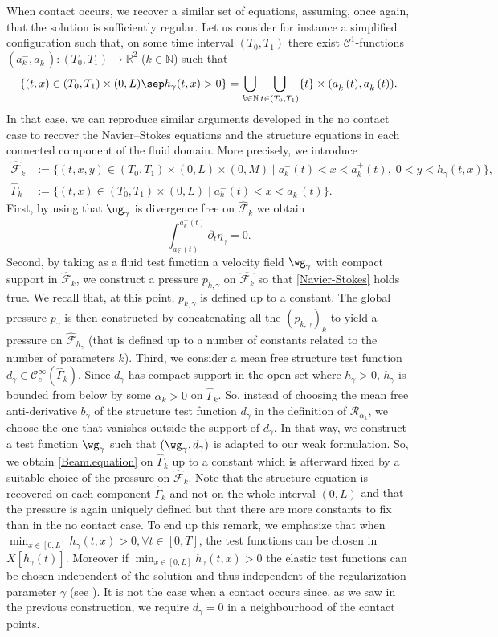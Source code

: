 When contact occurs, we recover a similar set of equations, assuming, once again, that the solution is sufficiently regular. Let us consider for instance a simplified configuration such that, on some time interval $(T_0,T_1)$ there exist $\mathcal C^1$-functions $(a_k^{-},a_k^+): (T_0,T_1) \to \mathbb R^2$ ($k\in \mathbb N$) such that
\[
\{(t,x) \in (T_0,T_1 )\times(0,L) \sep h_\gamma(t,x) >0 \} = \bigcup_{k\in\mathbb N} \bigcup_{t\in (T_0,T_1)} \{t\} \times (a_k^{-}(t),a_{k}^+(t)).
\]
In that case, we can reproduce similar arguments developed in the no contact case to recover the Navier--Stokes equations
and the structure equations in each connected component of the fluid domain.
More precisely, we introduce
\begin{align*}
\hat{\mathcal F}_k &:= \{(t,x,y) \in (T_0,T_1) \times (0,L) \times (0,M)\mid a_k^{-}(t) < x < a_k^{+}(t), \; 0 < y < h_{\gamma}(t,x) \},
\\
\hat{\Gamma}_k &:= \{(t,x) \in (T_0,T_1) \times (0,L)\mid a_k^{-}(t) < x < a_k^{+}(t) \}.
\end{align*}
First, by using that $\ug_{\gamma}$ is divergence free on $\hat{\mathcal F}_{k}$ we obtain
\[
\int_{a_{k}^{-}(t)}^{a_k^{+}(t)} \partial_t \eta_{\gamma} = 0.
\]
Second, by taking as a fluid test function a velocity field $\wg_{\gamma}$ with compact support in $\hat{\mathcal F}_k$,
we construct a pressure $p_{k,\gamma}$ on $\hat{\mathcal F_{k}}$ so that \eqref{Navier-Stokes} holds true.
We recall that, at this point, $p_{k,\gamma}$ is defined up to a constant. The global
pressure $p_{\gamma}$ is then constructed by concatenating all the $(p_{k,\gamma})_{k}$ to yield a pressure on $\hat{\mathcal F}_{h_{\gamma}}$
(that is defined up to a number of constants related to the number of parameters $k$).
Third, we consider a mean free structure test function $d_{\gamma} \in \mathcal{C}^{\infty}_c(\hat{\Gamma}_{k})$. Since $d_{\gamma}$
has compact support in the open set where $h_{\gamma} >0 $, $h_{\gamma}$ is bounded from below by some $\alpha_k>0$ on $\hat{\Gamma}_k$. So, instead of choosing the mean free anti-derivative $b_{\gamma}$ of the structure test function $d_{\gamma}$ in the definition of $\mathcal R_{{\alpha}_k}$, we choose the one that vanishes outside the support of $d_{\gamma}$.
In that way, we construct a test function $\wg_{\gamma}$ such that $(\wg_{\gamma},d_{\gamma})$ is adapted to our weak formulation. So, we
obtain \eqref{Beam.equation} on $\hat{\Gamma}_{k}$ up to a constant which is afterward fixed by a suitable choice of the pressure
on $\hat{\mathcal F}_{k}$. {Note that the structure equation is recovered on each component $\hat{\Gamma}_{k}$ and not on the whole interval $(0, L)$} and that the pressure is again uniquely defined but that there are more constants to fix than in the no contact case.
To end up this remark, we emphasize that when $\min_{x\in [0, L]}h_\gamma(t, x)>0, \forall t\in [0, T]$, the test functions can be chosen in $X[h_\gamma(t)]$. Moreover if $\min_{x\in [0, L]}h_\gamma(t, x)>0$ the elastic test functions can be chosen independent of the solution and thus independent of the regularization parameter $\gamma$ (see \cite{Chambolle-etal}). It is not the case when a contact occurs since, as we saw in the previous construction, we require $d_\gamma=0$ in a neighbourhood of the contact points.

